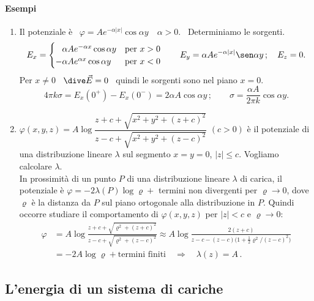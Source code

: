 \paragraph{Esempi}
\begin{enumerate}
\item Il potenziale è \ $\varphi=Ae^{-\alpha|x|}\cos\alpha y\quad\alpha>0$. \ Determiniamo le sorgenti.
\[
E_x=\begin{cases}\phantom{-}\alpha Ae^{-\alpha x}\cos\alpha y&\text{per }x>0\\ -\alpha Ae^{\alpha x}\cos\alpha y&\text{per }x<0\end{cases}
\qquad E_y=\alpha Ae^{-\alpha|x|}\sen\alpha y\,;\quad E_z=0.
\]
Per $x\neq0$ \ $\dive\vec E=0$ \ quindi le sorgenti sono nel piano $x=0$.
\[
4\pi k\sigma=E_x(0^+)-E_x(0^-)=2\alpha A\cos\alpha y\,;\qquad\sigma=\frac{\alpha A}{2\pi k}\cos\alpha y.
\]
\item $\varphi(x,y,z)=A\log\dfrac{z+c+\sqrt{x^2+y^2+(z+c)^2}}{z-c+\sqrt{x^2+y^2+(z-c)^2}}$ \quad $(c>0)$ \quad è il potenziale di una distribuzione lineare $\lambda$ sul segmento $x=y=0$, $|z|\le c$. Vogliamo calcolare $\lambda$.\\
In prossimità di un punto $P$ di una distribuzione lineare $\lambda$ di carica, il potenziale è $\varphi=-2\lambda(P)\log\varrho+{}$ termini non divergenti per $\varrho\to0$, dove $\varrho$ è la distanza da $P$ sul piano ortogonale alla distribuzione in $P$. Quindi occorre studiare il comportamento di $\varphi(x,y,z)$ per $|z|<c$ e $\varrho\to0$:
\[
\begin{split}
\varphi&=A\log\frac{z+c+\sqrt{\varrho^2+(z+c)^2}}{z-c+\sqrt{\varrho^2+(z-c)^2}}\approx A\log\frac{2(z+c)}{z-c-(z-c)\big(1+\frac12\varrho^2/(z-c)^2\big)}\\
&=-2A\log\varrho+\text{termini finiti}\quad\Rightarrow\quad\lambda(z)=A\,.
\end{split}
\]
\end{enumerate}

\subsection{L'energia di un sistema di cariche}

